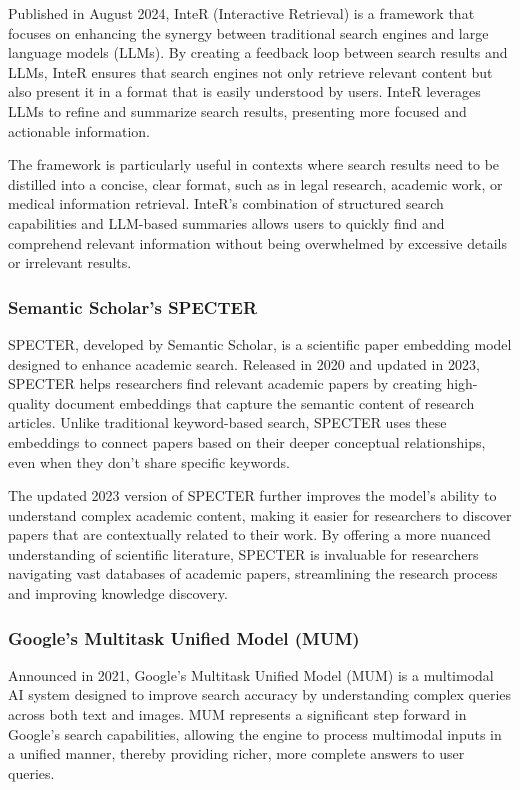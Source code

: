 Published in August 2024, InteR (Interactive Retrieval) is a framework that focuses on enhancing the synergy between traditional search engines and large language models (LLMs). 
By creating a feedback loop between search results and LLMs, InteR ensures that search engines not only retrieve relevant content but also present it in a format that is easily understood by users. 
InteR leverages LLMs to refine and summarize search results, presenting more focused and actionable information.

The framework is particularly useful in contexts where search results need to be distilled into a concise, clear format, such as in legal research, academic work, or medical information retrieval. 
InteR’s combination of structured search capabilities and LLM-based summaries allows users to quickly find and comprehend relevant information without being overwhelmed by excessive details or irrelevant results.

\subsubsection{Semantic Scholar’s SPECTER}

SPECTER, developed by Semantic Scholar, is a scientific paper embedding model designed to enhance academic search. 
Released in 2020 and updated in 2023, SPECTER helps researchers find relevant academic papers by creating high-quality document embeddings that capture the semantic content of research articles. 
Unlike traditional keyword-based search, SPECTER uses these embeddings to connect papers based on their deeper conceptual relationships, even when they don’t share specific keywords.

The updated 2023 version of SPECTER further improves the model's ability to understand complex academic content, making it easier for researchers to discover papers that are contextually related to their work. 
By offering a more nuanced understanding of scientific literature, SPECTER is invaluable for researchers navigating vast databases of academic papers, streamlining the research process and improving knowledge discovery.

\subsubsection{Google’s Multitask Unified Model (MUM)}

Announced in 2021, Google’s Multitask Unified Model (MUM) is a multimodal AI system designed to improve search accuracy by understanding complex queries across both text and images. 
MUM represents a significant step forward in Google’s search capabilities, allowing the engine to process multimodal inputs in a unified manner, thereby providing richer, more complete answers to user queries.

